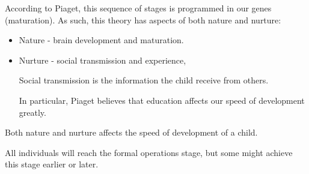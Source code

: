 \documentclass[../main/main.tex]{subfiles}
\begin{document}
According to Piaget, this sequence of stages is programmed in our genes (maturation). As such, this theory has aspects of both nature and nurture:
\begin{itemize}
  \item Nature - brain development and maturation.
        \item Nurture - social transmission and experience,
        \begin{definition}
Social transmission is the information the child receive from others.
        \end{definition}
        \begin{remark}
In particular, Piaget believes that education affects our speed of development greatly.
        \end{remark}
\end{itemize}
Both nature and nurture affects the speed of development of a child.
\begin{remark}
All individuals will reach the formal operations stage, but some might achieve this stage earlier or later.
\end{remark}
\end{document}
